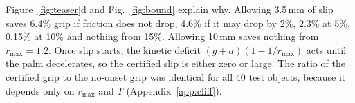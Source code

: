  Figure~\ref{fig:teaser}d and Fig.~\ref{fig:bound} explain
why. Allowing 3.5\,mm of slip saves 6.4\% grip if friction does not drop, 4.6\% if it may drop by 2\%, 2.3\% at 5\%,
0.15\% at 10\% and nothing from 15\%. Allowing 10\,mm saves nothing from $r_{\max}=1.2$. Once slip starts, the kinetic
deficit $(g+a)(1-1/r_{\max})$ acts until the palm decelerates, so the certified slip is either zero or large. The ratio of
the certified grip to the no-onset grip was identical for all 40 test objects, because it depends only on $r_{\max}$ and
$T$ (Appendix~\ref{app:cliff}).



